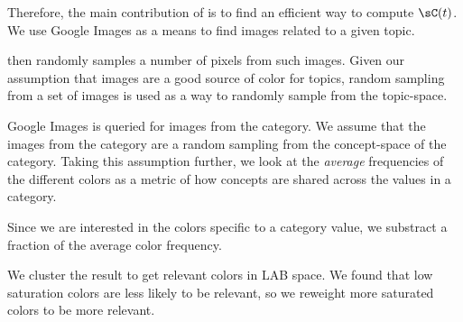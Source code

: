 Therefore, the main contribution of \system is to find an efficient way to compute $\sC(t)$. 
We use Google Images as a means to find images related to a given topic. 

\system then randomly samples a number of pixels from such images. Given our assumption that images are a good source of color for topics, random sampling from a set of images is used as a way to randomly sample from the topic-space.   

Google Images is queried for images from  the category.
We assume that the images from the category are a random sampling from the concept-space of the category. Taking this assumption further, we look at the {\em average} frequencies of the different colors as a metric of how concepts are shared across the values in a category.



Since we are interested in the colors specific to a category value, we substract a fraction of the average color frequency. 

We cluster the result to get relevant colors in LAB space. We found that low saturation colors are less likely to be relevant, 
so we reweight more saturated colors to be more relevant.
